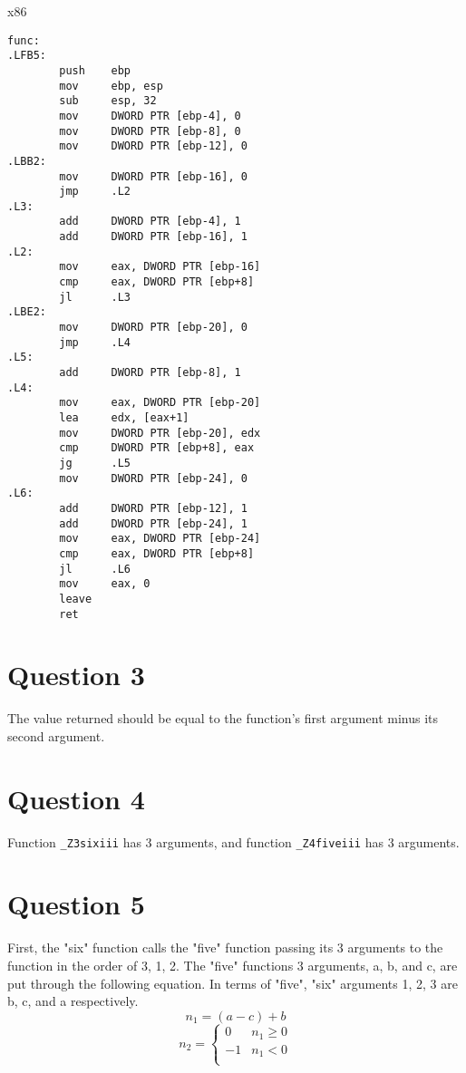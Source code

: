 \documentclass[11pt]{article}
\begin{document}
x86
\begin{lstlisting}
func:
.LFB5:
        push    ebp
        mov     ebp, esp
        sub     esp, 32
        mov     DWORD PTR [ebp-4], 0
        mov     DWORD PTR [ebp-8], 0
        mov     DWORD PTR [ebp-12], 0
.LBB2:
        mov     DWORD PTR [ebp-16], 0
        jmp     .L2
.L3:
        add     DWORD PTR [ebp-4], 1
        add     DWORD PTR [ebp-16], 1
.L2:
        mov     eax, DWORD PTR [ebp-16]
        cmp     eax, DWORD PTR [ebp+8]
        jl      .L3
.LBE2:
        mov     DWORD PTR [ebp-20], 0
        jmp     .L4
.L5:
        add     DWORD PTR [ebp-8], 1
.L4:
        mov     eax, DWORD PTR [ebp-20]
        lea     edx, [eax+1]
        mov     DWORD PTR [ebp-20], edx
        cmp     DWORD PTR [ebp+8], eax
        jg      .L5
        mov     DWORD PTR [ebp-24], 0
.L6:
        add     DWORD PTR [ebp-12], 1
        add     DWORD PTR [ebp-24], 1
        mov     eax, DWORD PTR [ebp-24]
        cmp     eax, DWORD PTR [ebp+8]
        jl      .L6
        mov     eax, 0
        leave
        ret
\end{lstlisting}


\section*{Question 3}
The value returned should be equal to the function's first argument minus its second argument.

\section*{Question 4}
Function \texttt{\_Z3sixiii} has 3 arguments, and function \texttt{\_Z4fiveiii} has 3 arguments.

\section*{Question 5}
First, the "six" function calls the "five" function passing its 3 arguments to the function in the order of 3, 1, 2. The "five" functions 3 arguments, a, b, and c, are put through the following equation. In terms of "five", "six" arguments 1, 2, 3 are b, c, and a respectively.
\[
    n_1 = (a - c) + b
\]
\[
    n_2 = \begin{cases}
        0 & n_1 \geq 0\\
        -1 & n_1 < 0\\
    \end{cases}
\]
\end{document}
